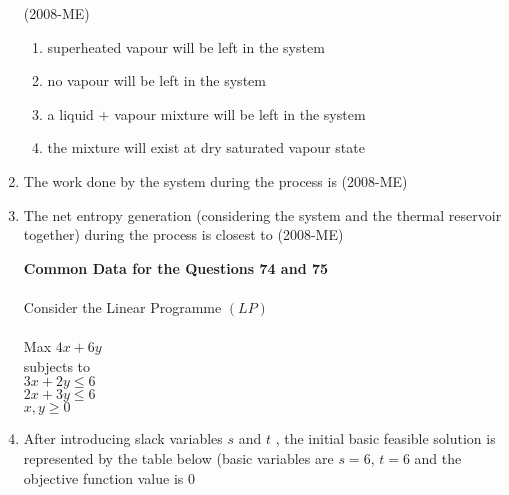 \documentclass[journal]{IEEEtran}
\begin{document}
\begin{enumerate}
	 \hfill (2008-ME)
 \begin{enumerate}
     \item superheated vapour will be left in the system 
     \item no vapour will be left in the system 
     \item a liquid $+$ vapour mixture will be left in the system 
     \item the mixture will exist at dry saturated vapour state 
 \end{enumerate}
 \item The work done by the system during the process is \hfill (2008-ME)
 \begin{enumerate}
 \end{enumerate}
\item The net entropy generation (considering the system and the thermal reservoir together) during the process is closest to \hfill (2008-ME)
\begin{enumerate}
\end{enumerate}
\textbf{Common Data for the Questions 74 and 75} \\ \\
Consider the Linear Programme $(LP)$ \\ \\
Max $4x+6y$ \\ subjects to \\ $3x+2y \leq 6$ \\ $2x+3y \leq 6$ \\
$x,y \geq 0$ \\ 
\item After introducing slack variables $s$
 and $t$
, the initial basic feasible solution is represented by the table below (basic variables are $s = 6$, $t = 6$
 and the objective function value is $0$

\end{enumerate}
\end{document}
